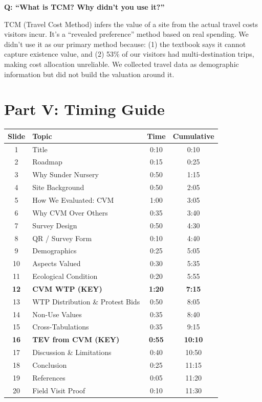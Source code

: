 \documentclass[11pt, a4paper]{article}
\newenvironment{ansbox}{%
    \def\FrameCommand{\textcolor{darkgreen}{\vrule width 2pt}\hspace{8pt}}%
    \MakeFramed{\advance\hsize-\width\FrameRestore}%
}{%
    \endMakeFramed%
}
\begin{document}
\textbf{Q: ``What is TCM? Why didn't you use it?''}
\begin{ansbox}
TCM (Travel Cost Method) infers the value of a site from the actual travel costs visitors incur. It's a ``revealed preference'' method based on real spending. We didn't use it as our primary method because: (1) the textbook says it cannot capture existence value, and (2) 53\% of our visitors had multi-destination trips, making cost allocation unreliable. We collected travel data as demographic information but did not build the valuation around it.
\end{ansbox}

\newpage
\part*{Part V: Timing Guide}

\begin{table}[h]
\centering
\begin{tabular}{clcc}
\toprule
\textbf{Slide} & \textbf{Topic} & \textbf{Time} & \textbf{Cumulative} \\
\midrule
1 & Title & 0:10 & 0:10 \\
2 & Roadmap & 0:15 & 0:25 \\
3 & Why Sunder Nursery & 0:50 & 1:15 \\
4 & Site Background & 0:50 & 2:05 \\
5 & How We Evaluated: CVM & 1:00 & 3:05 \\
6 & Why CVM Over Others & 0:35 & 3:40 \\
7 & Survey Design & 0:50 & 4:30 \\
8 & QR / Survey Form & 0:10 & 4:40 \\
9 & Demographics & 0:25 & 5:05 \\
10 & Aspects Valued & 0:30 & 5:35 \\
11 & Ecological Condition & 0:20 & 5:55 \\
\rowcolor{lightgray} \textbf{12} & \textbf{CVM WTP (KEY)} & \textbf{1:20} & \textbf{7:15} \\
13 & WTP Distribution \& Protest Bids & 0:50 & 8:05 \\
14 & Non-Use Values & 0:35 & 8:40 \\
15 & Cross-Tabulations & 0:35 & 9:15 \\
\rowcolor{lightgray} \textbf{16} & \textbf{TEV from CVM (KEY)} & \textbf{0:55} & \textbf{10:10} \\
17 & Discussion \& Limitations & 0:40 & 10:50 \\
18 & Conclusion & 0:25 & 11:15 \\
19 & References & 0:05 & 11:20 \\
20 & Field Visit Proof & 0:10 & 11:30 \\
\bottomrule
\end{tabular}
\end{table}
\end{document}
